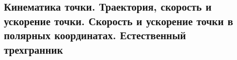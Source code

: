 

\subsection{Кинематика точки. Траектория, скорость и ускорение точки. Скорость и ускорение точки в полярных координатах. Естественный трехгранник}



